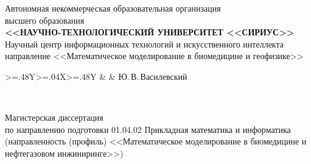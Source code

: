 \begin{spacing}{1.0}
\fontsize{12}{14.5}\selectfont

\begin{center}
    Автономная некоммерческая образовательная организация \\ высшего образования \\
    \textbf{<<НАУЧНО-ТЕХНОЛОГИЧЕСКИЙ УНИВЕРСИТЕТ <<СИРИУС>>} \\
    \vspace{0.66\baselineskip}
    Научный центр информационных технологий и искусственного интеллекта \\
    \vspace{0.66\baselineskip}
    направление <<Математическое моделирование в биомедицине и геофизике>> \\

    \vspace{1.5\baselineskip}

    \begin{tabularx}{\textwidth}{>{\hsize=.48\hsize}Y>{\hsize=.04\hsize}X>{\hsize=.48\hsize}Y}
        & & 
            {Ю.\,В.\,Василевский}
    \end{tabularx}

    \vspace{\fill}

    {\large\MakeUppercase{\thetitle}} \\

    \vspace{0.5\baselineskip}

    Магистерская диссертация \\
    по направлению подготовки 01.04.02 Прикладная математика и информатика \\
    (направленность (профиль) <<Математическое моделирование в биомедицине и нефтегазовом инжиниринге>>) \\

    \vspace{\fill}


\end{center}
\end{spacing}

